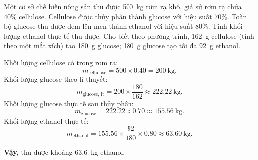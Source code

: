 \begin{tuluyen}
Một cơ sở chế biến nông sản thu được \SI{500}{\kilo\gram} rơm rạ khô, giả sử rơm rạ chứa $40\%$ cellulose. Cellulose được thủy phân thành glucose với hiệu suất $70\%$. Toàn bộ glucose thu được đem lên men thành ethanol với hiệu suất $80\%$. Tính khối lượng ethanol thực tế thu được. Cho biết theo phương trình, \SI{162}{\gram} cellulose (tính theo một mắt xích) tạo \SI{180}{\gram} glucose; \SI{180}{\gram} glucose tạo tối đa \SI{92}{\gram} ethanol.
\begin{loigiaiBT}
Khối lượng cellulose có trong rơm rạ:
\[
m_{\text{cellulose}}=500\times0.40=\SI{200}{\kilo\gram}.
\]
Khối lượng glucose theo lí thuyết:
\[
m_{\text{glucose, lt}}=200\times\frac{180}{162}
\approx\SI{222.22}{\kilo\gram}.
\]
Khối lượng glucose thực tế sau thủy phân:
\[
m_{\text{glucose}}=222.22\times0.70
\approx\SI{155.56}{\kilo\gram}.
\]
Khối lượng ethanol thực tế:
\[
m_{\text{ethanol}}=155.56\times\frac{92}{180}\times0.80
\approx\SI{63.60}{\kilo\gram}.
\]

\textbf{Vậy,} thu được khoảng \SI{63.6}{\kilo\gram} ethanol.
\end{loigiaiBT}
\end{tuluyen}

